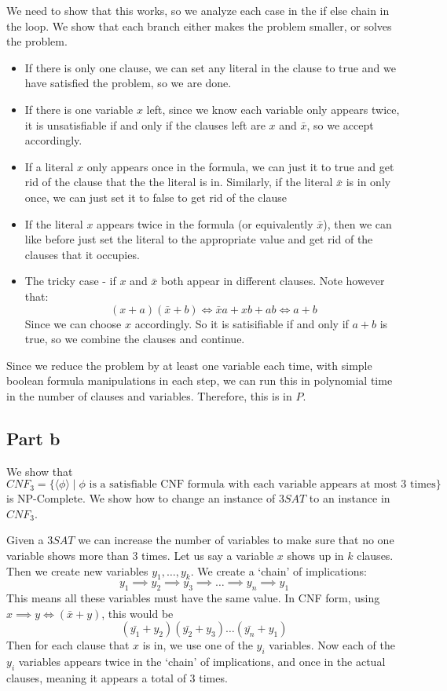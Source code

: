 \documentclass[english]{article}
\begin{document}
We need to show that this works, so we analyze each case in the if else chain in the loop. We show
that each branch either makes the problem smaller, or solves the problem.
\begin{itemize}
\item If there is only one clause, we can set any literal in the clause to true and we have satisfied the problem,
        so we are done.
\item If there is one variable $x$ left, since we know each variable only appears twice, it is unsatisfiable if and 
        only if the clauses left are $x$ and $\bar{x}$, so we accept accordingly.
\item If a literal $x$ only appears once in the formula, we can just it to true and get rid of the clause that the
        the literal is in. Similarly, if the literal $\bar{x}$ is in only once, we can just set it to false to get
        rid of the clause
\item If the literal $x$ appears twice in the formula (or equivalently $\bar{x}$), then we can like before just set
        the literal to the appropriate value and get rid of the clauses that it occupies.
\item The tricky case - if $x$ and $\bar{x}$ both appear in different clauses. Note however that:
        \[ (x + a)(\bar{x} + b) \iff \bar{x}a + xb + ab \iff a + b \]
      Since we can choose $x$ accordingly. So it is satisifiable if and only if $a + b$ is true, so we combine
      the clauses and continue.
\end{itemize}

Since we reduce the problem by at least one variable each time, with simple boolean formula manipulations
in each step, we can run this in polynomial time in the number of clauses and variables. Therefore, this is
in $P$.

\subsection*{Part b}
We show that $CNF_3 = \{\langle \phi \rangle \mid \phi \textrm{ is a satisfiable CNF formula with each 
variable appears at most 3 times}\}$ is NP-Complete. We show how to change an instance of $3SAT$ to
an instance in $CNF_3$.

Given a $3SAT$ we can increase the number of variables to make sure that no one variable shows more than 3 times. 
Let us say a variable $x$ shows up in $k$ clauses. Then we create new variables $y_1,\ldots,y_k$. We create a `chain'
of implications:
\[y_1 \implies y_2 \implies y_3 \implies \ldots \implies y_n \implies y_1\]
This means all these variables must have the same value. In CNF form, using $x \implies y \iff (\bar{x} + y)$,
this would be 
\[(\bar{y_1} + y_2)(\bar{y_2} + y_3) \ldots (\bar{y_n} + y_1)\]
Then for each clause that $x$ is in, we use one of the $y_i$ variables. Now each of the $y_i$ variables appears
twice in the `chain' of implications, and once in the actual clauses, meaning it appears a total of 3 times. 
\end{document}

